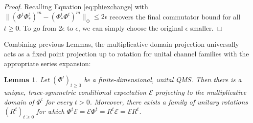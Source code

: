 \documentclass[accepted=2026-02-01, letterpaper]{quantumarticle}
\newtheorem{lemma}{Lemma}[section]
\newcommand{\E}{\mathcal{E}}
\newcommand{\pl}{\hspace{.1cm}}
\begin{document}
\begin{proof}

Recalling Equation \ref{eq:phiexchange} with $\| (\Phi^{t} \Phi^{t}_*)^m - (\Phi^{t}_* \Phi^{t})^m \|_{\Diamond} \leq 2 \epsilon$ recovers the final commutator bound for all $t \geq 0$. To go from $2 \epsilon$ to $\epsilon$, we can simply choose the original $\epsilon$ smaller.
\end{proof}
Combining previous Lemmas, the multiplicative domain projection universally acts as a fixed point projection up to rotation for unital channel families with the appropriate series expansion:
\begin{lemma} \label{lem:converge2}
Let $(\Phi^{t})_{t \geq 0}$ be a finite-dimensional, unital QMS. Then there is a unique, trace-symmetric conditional expectation $\E$ projecting to the multiplicative domain of $\Phi^{t}$ for every $t > 0$. Moreover, there exists a family of unitary rotations $(R^{t})_{t \geq 0}$ for which $\Phi^{t} \E = \E \Phi^{t} = R^{t} \E = \E R^{t}$.
\end{lemma}
\end{document}
